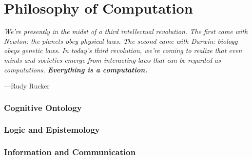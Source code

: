 \part*{Philosophy of Computation}

\vspace{4mm}
\begin{displayquote}
	\textit{We're presently in the midst of a third intellectual revolution. The first came with Newton: the planets obey physical laws. The second came with Darwin: biology obeys genetic laws. In today’s third revolution, we're coming to realize that even minds and societies emerge from interacting laws that can be regarded as computations. \textbf{Everything is a computation.}}
	\vspace{2mm}
	\begin{flushright}
		---Rudy Rucker
	\end{flushright}
\end{displayquote}
\vspace{4mm}








\toclineskip
\section{Cognitive Ontology}

\toclineskip
\section{Logic and Epistemology}

\toclineskip
\section{Information and Communication}

